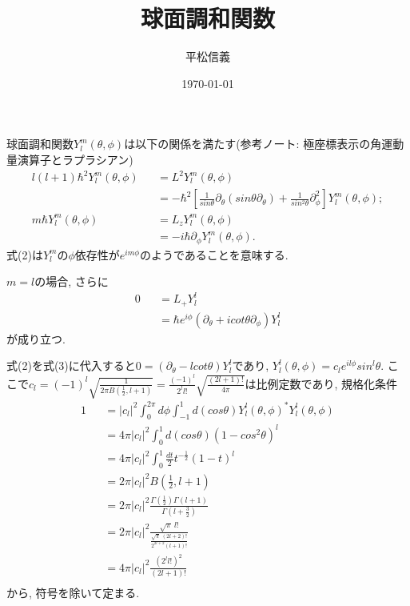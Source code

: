 \documentclass[11pt,a4paper]{jsarticle}
\title{球面調和関数}
\author{平松信義}
\date{\today}
\begin{document}
\maketitle

球面調和関数$Y_l^m(\theta,\phi)$は以下の関係を満たす(参考ノート: 極座標表示の角運動量演算子とラプラシアン)
\begin{eqnarray}
 l(l+1)\hbar^2 Y_l^m(\theta,\phi)  &&= L^2 Y_l^m(\theta,\phi) \nonumber \\
 &&= -\hbar^2 [  \frac{1}{sin\theta }\partial_\theta  ( sin\theta  \partial_\theta) + \frac{1}{sin^2\theta } \partial_\phi^2  ] Y_l^m(\theta,\phi) ; \\
  m \hbar Y_l^m(\theta,\phi)  &&= L_z Y_l^m(\theta,\phi) \nonumber \\
 &&= -i\hbar \partial_\phi Y_l^m(\theta,\phi). 
\end{eqnarray}
式(2)は$Y_l^m$の$\phi$依存性が$e^{im\phi}$のようであることを意味する. 

$m=l$の場合, さらに
\begin{eqnarray}
0 &&= L_+ Y_l^l \nonumber \\
&&= \hbar e^{i\phi} ( \partial_\theta  + i cot\theta  \partial_\phi)Y_l^l
\end{eqnarray}
が成り立つ. 

式(2)を式(3)に代入すると$0 =( \partial_\theta  - l cot\theta )Y_l^l$であり, $Y_l^l (\theta,\phi)= c_l e^{il\phi} sin^l \theta$. ここで$c_l=(-1)^l\sqrt{\frac{1}{2\pi B(\frac{1}{2}, l+1)}}=\frac{(-1)^l}{2^{l}l!} \sqrt{\frac{(2l+1)!}{4\pi}}$は比例定数であり, 規格化条件
\begin{eqnarray}
1 &&= |c_l|^2 \int_0^{2\pi}d\phi  \int_{-1}^{1} d(cos\theta) Y_l^l(\theta,\phi)^* Y_l^l(\theta,\phi)\nonumber \\
&&= 4\pi  |c_l|^2 \int_{0}^{1} d(cos\theta) (1-cos^2\theta)^l \nonumber \\
&&= 4\pi  |c_l|^2 \int_{0}^{1}  \frac{dt}{2}t^{-\frac{1}{2}} (1-t)^l \nonumber \\
&&= 2\pi  |c_l|^2 B(\frac{1}{2}, l+1) \nonumber \\
&&= 2\pi  |c_l|^2 \frac{\Gamma(\frac{1}{2})\Gamma(l+1)}{\Gamma(l+\frac{3}{2})} \nonumber \\
&&= 2\pi  |c_l|^2 \frac{\sqrt{\pi}\:l!}{\frac{\sqrt{\pi}\:(2l+2)!}{2^{2l+2}(l+1)!}} \nonumber \\
&&= 4\pi  |c_l|^2 \frac{(2^{l}l!)^2}{(2l+1)!} \nonumber \\
\end{eqnarray}
から, 符号を除いて定まる.  
\end{document}
